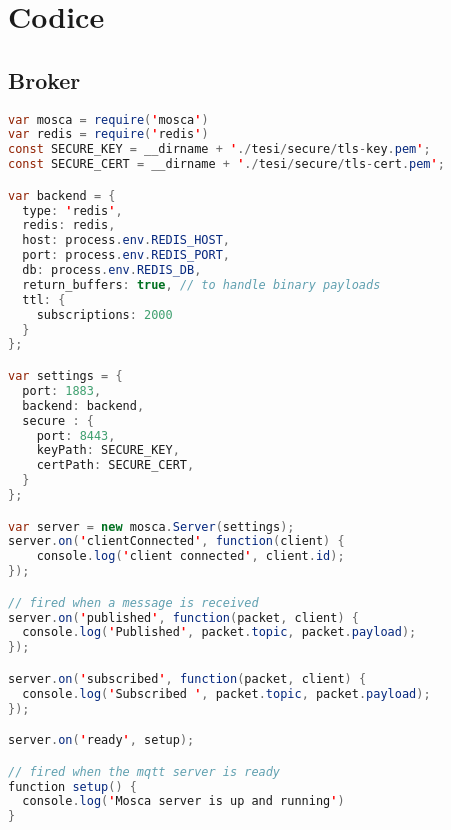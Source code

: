 \chapter{Codice}
\section{Broker}
\begin{lstlisting}[language=Java, caption={broker.js}, label={lst:broker}]
var mosca = require('mosca')
var redis = require('redis')
const SECURE_KEY = __dirname + './tesi/secure/tls-key.pem';
const SECURE_CERT = __dirname + './tesi/secure/tls-cert.pem';

var backend = {
  type: 'redis',
  redis: redis,
  host: process.env.REDIS_HOST,
  port: process.env.REDIS_PORT,
  db: process.env.REDIS_DB,
  return_buffers: true, // to handle binary payloads
  ttl: {
    subscriptions: 2000
  }
};

var settings = {
  port: 1883,
  backend: backend,
  secure : {
    port: 8443,
    keyPath: SECURE_KEY,
    certPath: SECURE_CERT,
  }
};

var server = new mosca.Server(settings);
server.on('clientConnected', function(client) {
	console.log('client connected', client.id);
});

// fired when a message is received
server.on('published', function(packet, client) {
  console.log('Published', packet.topic, packet.payload);
});

server.on('subscribed', function(packet, client) {
  console.log('Subscribed ', packet.topic, packet.payload);
});

server.on('ready', setup);

// fired when the mqtt server is ready
function setup() {
  console.log('Mosca server is up and running')
}
\end{lstlisting}
\newpage

